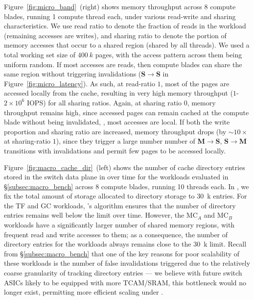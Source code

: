  Figure~\ref{fig:micro_band}~(right) shows \mind memory throughput across 8 compute blades, running 1 compute thread each, under various read-write and sharing characteristics. We use read ratio to denote the fraction of reads in the workload (remaining accesses are writes), and sharing ratio to denote the portion of memory accesses that occur to a shared region (shared by all threads). We used a total working set size of $400~k$ pages, with the access pattern across them being uniform random. If most accesses are reads, then compute blades can share the same region without triggering invalidations (\textbf{S}$\rightarrow$\textbf{S} in Figure~\ref{fig:micro_latency}). As such, at read-ratio $1$, most of the pages are accessed locally from the cache, resulting in very high memory throughput ($1$-$2\times 10^{6}$ IOPS) for all sharing ratios. Again, at sharing ratio $0$, memory throughput remains high, since accessed pages can remain cached at the compute blade without being invalidated, \ie, most accesses are local. If both the write proportion and sharing ratio are increased, memory throughput drops (by ${\sim} 10\times$ at sharing-ratio $1$), since they trigger a large number number of \textbf{M}$\rightarrow$\textbf{S}, \textbf{S}$\rightarrow$\textbf{M} transitions with invalidations and permit few pages to be accessed locally.

 Figure~\ref{fig:macro_cache_dir}~(left) shows the number of cache directory entries stored in the switch data plane in \mind over time for the workloads evaluated in \S\ref{subsec:macro_bench} across 8 compute blades, running 10 threads each. In \mind, we fix the total amount of storage allocated to directory storage to $30$~k entries. For the TF and GC workloads, \mind's \mindalgo algorithm ensures that the number of directory entries remains well below the limit over time. However, the MC$_{A}$ and MC$_{B}$ workloads have a significantly larger number of shared memory regions, with frequent read and write accesses to them; as a consequence, the number of directory entries for the workloads always remains close to the $30$~k limit. Recall from \S\ref{subsec:macro_bench} that one of the key reasons for poor scalability of these workloads is the number of false invalidations triggered due to the relatively coarse granularity of tracking directory entries --- we believe with future switch ASICs likely to be equipped with more TCAM/SRAM, this bottleneck would no longer exist, permitting more efficient scaling under \mind.

